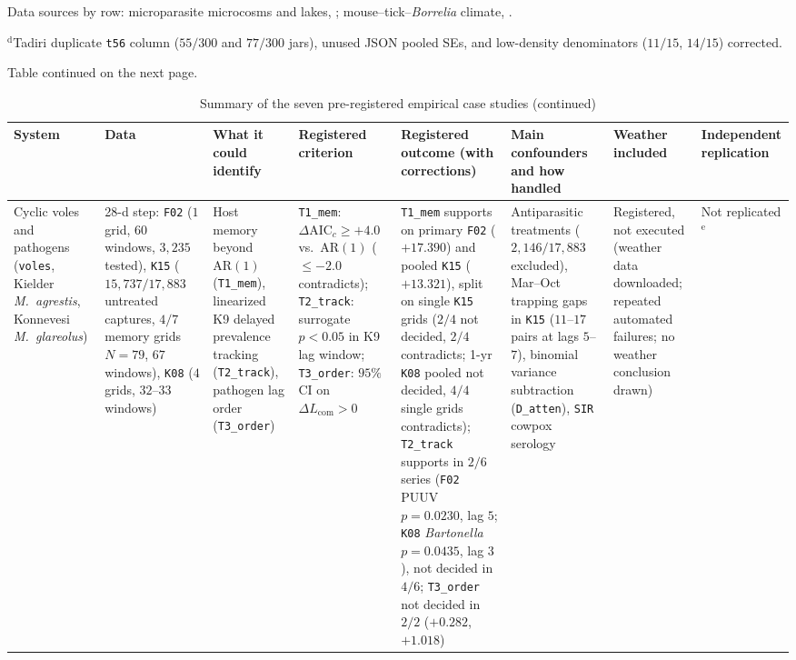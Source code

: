 \begin{table}[p]
{\begin{tabular}{@{}p{}p{}p{}p{}p{}p{}p{}p{}@{}}
\bottomrule
\end{tabular}
\par\vspace{2pt}
\raggedright Data sources by row: microparasite microcosms and lakes, \citealp{ferris2020,duncan2013,dallas2018,dallas2016,clerc2015,tadiri2023,davenport2024,krichel2023}; mouse--tick--\textit{Borrelia} climate, \citealp{ostfeld20182019,ladeau2025,neon2026a,neon2026b,neon2026c,thornton2022}.\par
$^{\mathrm{d}}$Tadiri duplicate \texttt{t56} column ($55/300$ and $77/300$ jars), unused JSON pooled SEs, and low-density denominators ($11/15$, $14/15$) corrected.\par
Table continued on the next page.}
\end{table}

\begin{table}[p]
\addtocounter{table}{-1}\caption{Summary of the seven pre-registered empirical case studies (continued)}
{\tiny\setlength{\tabcolsep}{2pt}\renewcommand{\arraystretch}{1.12}
\begin{tabular}{@{}p{}p{}p{}p{}p{}p{}p{}p{}@{}}
\toprule
System & Data & What it could identify & Registered criterion & Registered outcome (with corrections) & Main confounders and how handled & Weather included & Independent replication \\
\midrule
Cyclic voles and pathogens (\texttt{voles}, Kielder \textit{M.~agrestis}, Konnevesi \textit{M.~glareolus}) & 28-d step: \texttt{F02} ($1$ grid, $60$ windows, $3{,}235$ tested), \texttt{K15} ($15{,}737/17{,}883$ untreated captures, $4/7$ memory grids $N = 79$, $67$ windows), \texttt{K08} ($4$ grids, $32$--$33$ windows) & Host memory beyond $\mathrm{AR}(1)$ (\texttt{T1\_mem}), linearized K9 delayed prevalence tracking (\texttt{T2\_track}), pathogen lag order (\texttt{T3\_order}) & \texttt{T1\_mem}: $\Delta\mathrm{AIC}_c \ge +4.0$ vs.\ $\mathrm{AR}(1)$ ($\le -2.0$ contradicts); \texttt{T2\_track}: surrogate $p < 0.05$ in K9 lag window; \texttt{T3\_order}: $95\%$ CI on $\Delta L_{\mathrm{com}} > 0$ & \texttt{T1\_mem} supports on primary \texttt{F02} ($+17.390$) and pooled \texttt{K15} ($+13.321$), split on single \texttt{K15} grids ($2/4$ not decided, $2/4$ contradicts; 1-yr \texttt{K08} pooled not decided, $4/4$ single grids contradicts); \texttt{T2\_track} supports in $2/6$ series (\texttt{F02} PUUV $p = 0.0230$, lag $5$; \texttt{K08} \textit{Bartonella} $p = 0.0435$, lag $3$), not decided in $4/6$; \texttt{T3\_order} not decided in $2/2$ ($+0.282$, $+1.018$) & Antiparasitic treatments ($2{,}146/17{,}883$ excluded), Mar--Oct trapping gaps in \texttt{K15} ($11$--$17$ pairs at lags $5$--$7$), binomial variance subtraction (\texttt{D\_atten}), \texttt{SIR} cowpox serology & Registered, not executed (weather data downloaded; repeated automated failures; no weather conclusion drawn) & Not replicated$^{\mathrm{e}}$ \\

\end{tabular}}
\end{table}
